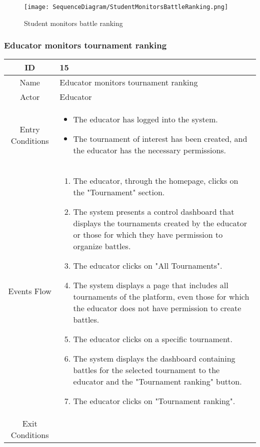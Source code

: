     \begin{figure}[H]
  \texttt{[image: SequenceDiagram/StudentMonitorsBattleRanking.png]} 
  \caption{Student monitors battle ranking}
  \label{fig:immagine}
\end{figure}

\newpage
\subsubsection{Educator monitors tournament ranking}

\begin{longtable}{|c| p{10cm}|}
    \hline
        ID & 15 \\
    \hline
        Name & Educator monitors tournament ranking \\
    \hline
        Actor & Educator \\
    \hline
        Entry Conditions & 
            \begin{itemize}
                \item The educator has logged into the system.
                \item The tournament of interest has been created, and the educator has the necessary permissions.
            \end{itemize}\\
    \hline
        Events Flow &   \begin{enumerate}
                            \item The educator, through the homepage, clicks on the "Tournament" section.
                            \item The system presents a control dashboard that displays the tournaments created by the educator or those for which they have permission to organize battles.
                            \item The educator clicks on "All Tournaments".
                            \item The system displays a page that includes all tournaments of the platform, even those for which the educator does not have permission to create battles.
                            \item The educator clicks on a specific tournament.
                            \item The system displays the dashboard containing battles for the selected tournament to the educator and the "Tournament ranking" button.
                            \item The educator clicks on "Tournament ranking".
                        \end{enumerate} \\
    \hline
        Exit Conditions &


\end{longtable}
